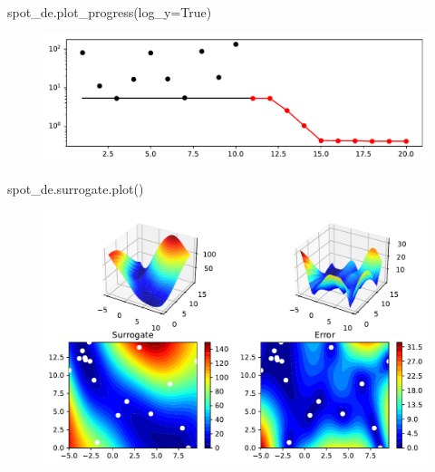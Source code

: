 \documentclass[
  letterpaper,
  DIV=11,
  numbers=noendperiod]{scrreprt}
\newenvironment{Shaded}{\begin{snugshade}}{\end{snugshade}}
\newcommand{\NormalTok}[1]{\textcolor[rgb]{0.00,0.23,0.31}{#1}}
\newcommand{\OperatorTok}[1]{\textcolor[rgb]{0.37,0.37,0.37}{#1}}
\newcommand{\VariableTok}[1]{\textcolor[rgb]{0.07,0.07,0.07}{#1}}
\begin{document}
\begin{Shaded}
\begin{Highlighting}[]
\NormalTok{spot\_de.plot\_progress(log\_y}\OperatorTok{=}\VariableTok{True}\NormalTok{)}
\end{Highlighting}
\end{Shaded}

\begin{figure}[H]

{\centering \includegraphics{05_spot_sklearn_optimization_files/figure-pdf/cell-8-output-1.pdf}

}

\end{figure}

\begin{Shaded}
\begin{Highlighting}[]
\NormalTok{spot\_de.surrogate.plot()}
\end{Highlighting}
\end{Shaded}

\begin{figure}[H]

{\centering \includegraphics{05_spot_sklearn_optimization_files/figure-pdf/cell-9-output-1.pdf}

}

\end{figure}
\end{document}

